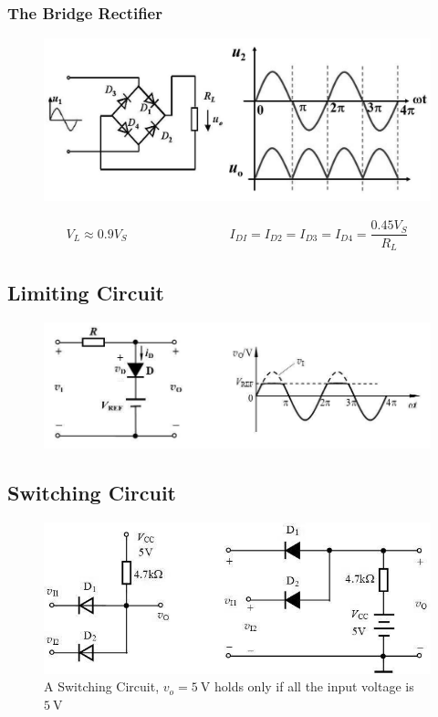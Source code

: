 \subsubsection{The Bridge Rectifier}

\begin{figure}[H]
  \centering
  \includegraphics[width=0.9\linewidth]{figures/BridgedRectifierCircuit}
\end{figure}

\begin{equation*}
  \begin{aligned}
    V_L \approx 0.9 V_S \quad\quad \quad\quad \quad\quad \quad\quad  I_{DI} = I_{D2} = I_{D3} = I_{D4} = \dfrac{0.45 V_S}{R_L} 
  \end{aligned}
\end{equation*}

\subsection{Limiting Circuit}

\begin{figure}[H]
  \centering
  \includegraphics[width=0.8\linewidth]{figures/LimitingCircuit}
\end{figure}

\subsection{Switching Circuit}

\begin{figure}[H]
  \centering
  \includegraphics[width=0.8\linewidth]{figures/SwitchCircuit}
  \caption{A Switching Circuit, $v_o = 5 \  \mathrm{V}$ holds only if all the input voltage is $5 \  \mathrm{V}$}
\end{figure}

